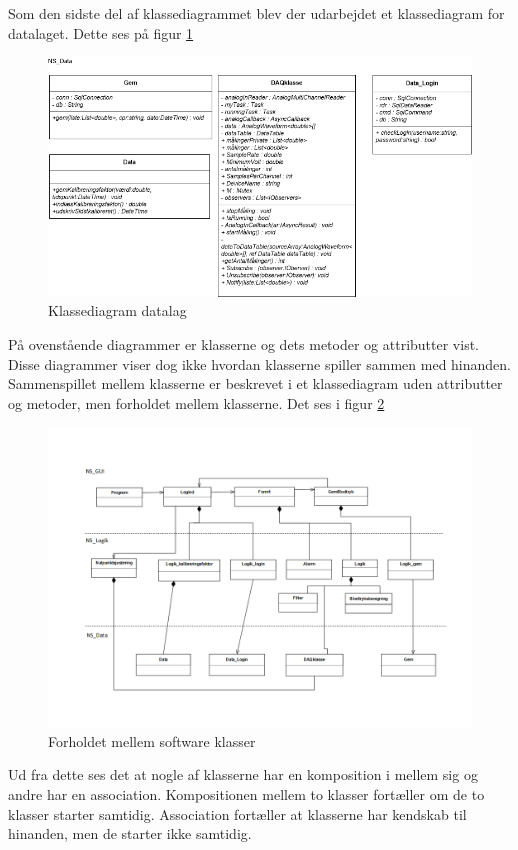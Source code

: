 Som den sidste del af klassediagrammet blev der udarbejdet et klassediagram for datalaget. Dette ses på figur \ref{klassediagramdata}
\begin{figure}[H]
	\includegraphics[width=1\textwidth]{Figurer/Softwareimplementering/UML-klassediagramdata}
	\caption{Klassediagram datalag}
	\label{klassediagramdata}
\end{figure}


På ovenstående diagrammer er klasserne og dets metoder og attributter vist. Disse diagrammer viser dog ikke hvordan klasserne spiller sammen med hinanden. Sammenspillet mellem klasserne er beskrevet i et klassediagram uden attributter og metoder, men forholdet mellem klasserne. Det ses i figur \ref{komposition}
\begin{figure}[H]
	\includegraphics[width=1\textwidth]{Figurer/Softwareimplementering/komposition}
	\caption{Forholdet mellem software klasser}
	\label{komposition}
\end{figure}
Ud fra dette ses det at nogle af klasserne har en komposition i mellem sig og andre har en association. Kompositionen mellem to klasser fortæller om de to klasser starter samtidig. Association fortæller at klasserne har kendskab til hinanden, men de starter ikke samtidig.  

